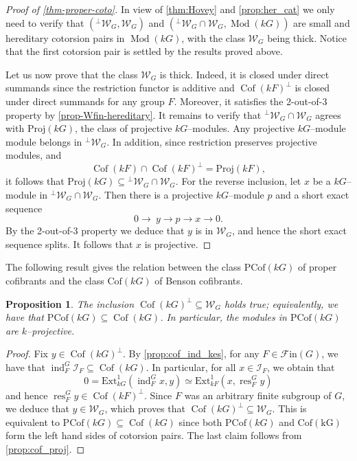 \documentclass{amsart}
\newcommand{\res}{\operatorname{res}\nolimits}
\newcommand{\ind}{\operatorname{ind}\nolimits}
\def \Fin{{\mathcal{F}\textrm{in}}}
\def \Wfin{{\mathcal W}_{G}}
\DeclareMathOperator{\Mod}{Mod}
\DeclareMathOperator{\Cof}{Cof}
\numberwithin{equation}{section}%
\newtheorem{proposition}[equation]{Proposition}
\theoremstyle{remark}
\begin{document}
\begin{proof}[Proof of \cref{thm-proper-coto}]
   {In view of \cref{thm:Hovey} and  \cref{prop:her_cat} we only need to} verify that $({}^\perp\Wfin,\Wfin)$ and $({}^\perp\Wfin\cap\Wfin,\Mod(kG))$ are small and hereditary cotorsion pairs in $\Mod(kG)$, with the class $\Wfin$ being thick. Notice that the first cotorsion pair is settled by the results proved above. 
   
   Let us now prove that the class $\Wfin$ is thick. Indeed, it is closed under direct summands  since the restriction functor is additive and $\Cof(kF)^\perp$ is closed under direct summands for any group $F$. Moreover, it satisfies the 2-out-of-3 property by \cref{prop-Wfin-hereditary}. It remains to verify that ${}^\perp\Wfin\cap\Wfin$ agrees with $\mathrm{Proj}(kG)$, the class of projective $kG$--modules. Any projective $kG$--module module belongs in ${}^\perp\Wfin$. In addition, since restriction preserves projective modules, and 
   \[
   \Cof(kF)\cap \Cof(kF)^\perp=\mathrm{Proj}(kF),
   \]
    it follows that   $\mathrm{Proj}(kG)\subseteq {}^\perp\Wfin\cap\Wfin$. 
    For the reverse inclusion, let $x$ be a $kG$--module in ${}^\perp\Wfin\cap\Wfin$. Then there is a projective $kG$--module $p$ and a short exact sequence 
    \[
    0\to \ y\to p \to x\to 0.
    \]
    By the 2-out-of-3 property we deduce that $y$ is in $\Wfin$, and hence the short exact sequence splits. It follows that $x$ is projective.
\end{proof}

The following result gives the relation between the class $\mathrm{PCof}(kG)$ of proper cofibrants and the class $\mathrm{Cof}(kG)$ of Benson cofibrants.

\begin{proposition}\label{rem-Wfin-contains-cof}
The inclusion $\Cof(kG)^\perp\subseteq\Wfin$ holds true; equivalently, we have that $\mathrm{PCof}(kG)\subseteq \Cof(kG)$. In particular, the modules in $\mathrm{PCof}(kG)$ are $k$--projective. 
\end{proposition}

\begin{proof}
Fix  $y\in \Cof(kG)^\perp$. By \cref{prop:cof_ind_kes},  for any $F\in \Fin(G)$, we have that  $\ind_F^G\mathcal{I}_F\subseteq \Cof(kG)$. In particular, for all $x\in \mathcal{I}_F$, we obtain that 
\[
0=\mathrm{Ext}^1_{kG}(\ind^G_Fx,y)\simeq \mathrm{Ext}^1_{kF}(x,\res^G_F y)
\] 
and hence $\res_F^Gy\in \Cof(kF)^\perp$. Since $F$ was an arbitrary finite subgroup of $G$, we deduce that $y\in \Wfin$, which proves that $\Cof(kG)^\perp\subseteq\Wfin$. This is equivalent to $\mathrm{PCof}(kG)\subseteq \Cof(kG)$ since both $\mathrm{PCof}(kG)$ and $\mathrm{Cof(kG)}$ form the left hand sides of cotorsion pairs. The last claim follows from \cref{prop:cof_proj}.
\end{proof}
\end{document}
